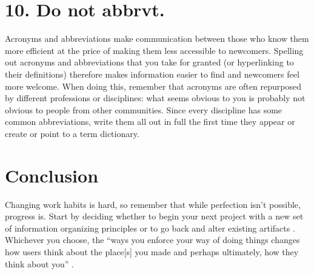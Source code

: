 \documentclass[10pt,letterpaper]{article}
\newcommand{\rulemajor}[1]{\section*{#1}}
\begin{document}
\rulemajor{10. Do not abbrvt.}

Acronyms and abbreviations make communication between those who know them more
efficient at the price of making them less accessible to newcomers. Spelling
out acronyms and abbreviations that you take for granted (or hyperlinking to
their definitions) therefore makes information easier to find and newcomers feel
more welcome. When doing this, remember that acronyms are often repurposed by
different professions or disciplines: what seems obvious to you is probably not
obvious to people from other communities. Since every discipline has some common
abbreviations, write them all out in full the first time they appear or create
or point to a term dictionary.

\section*{Conclusion}

Changing work habits is hard, so remember that while perfection isn't possible,
progress is. Start by deciding whether to begin your next project with a new set
of information organizing principles or to go back and alter existing artifacts
\cite{Briney2015}. Whichever you choose, the ``ways you enforce your way of
doing things changes how users think about the place[s] you made and perhaps
ultimately, how they think about you'' \cite{Covert2014}.


\end{document}
